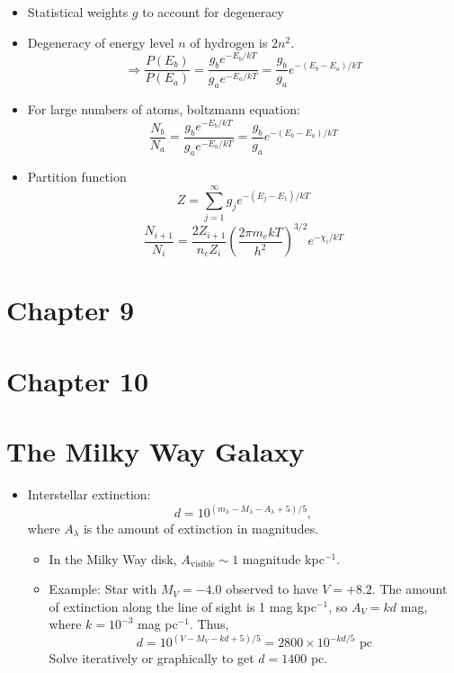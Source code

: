 \documentclass[12pt]{article}
\begin{document}
\begin{itemize}
\item Statistical weights $g$ to account for degeneracy
\item Degeneracy of energy level $n$ of hydrogen is $2n^2$.
\begin{equation}
\Longrightarrow \frac{P(E_b)}{P(E_a)} = \frac{g_b e^{-E_b/kT}}{g_a e^{-E_a/kT}} = \frac{g_b}{g_a} e^{-(E_b - E_a)/kT}
\end{equation}
\item For large numbers of atoms, boltzmann equation:
\begin{equation}
\frac{N_b}{N_a} = \frac{g_b e^{-E_b/kT}}{g_a e^{-E_a/kT}} = \frac{g_b}{g_a} e^{-(E_b - E_a)/kT}
\end{equation}
\item Partition function
\begin{equation}
Z = \sum_{j=1}^{\infty} g_j e^{-(E_j - E_1)/kT}
\end{equation}
\begin{equation}
\frac{N_{i+1}}{N_i} = \frac{2 Z_{i+1}}{n_e Z_i}\left(\frac{2\pi m_e k T}{h^2}\right)^{3/2} e^{-\chi_i/kT}
\end{equation}
\end{itemize}

\section*{Chapter 9}

\section*{Chapter 10}

\section{The Milky Way Galaxy}
\begin{itemize}
\item Interstellar extinction:
\begin{equation}
d = 10^{(m_\lambda - M_\lambda - A_\lambda + 5)/5},
\end{equation}
where $A_\lambda$ is the amount of extinction in magnitudes.
\begin{itemize}
\item In the Milky Way disk, $A_\text{visible}\sim 1$ magnitude kpc$^{-1}$.
\item Example: Star with $M_V = -4.0$ observed to have $V = +8.2$. The amount of extinction along the line of sight is 1 mag kpc$^{-1}$, so $A_V = kd$ mag, where $k = 10^{-3}$ mag pc$^{-1}$. Thus,
\begin{equation}
d = 10^{(V - M_V - kd + 5)/5} = 2800\times 10^{-kd/5}\text{ pc}
\end{equation}
Solve iteratively or graphically to get $d = 1400$ pc.
\end{itemize}
\end{itemize}
\end{document}

